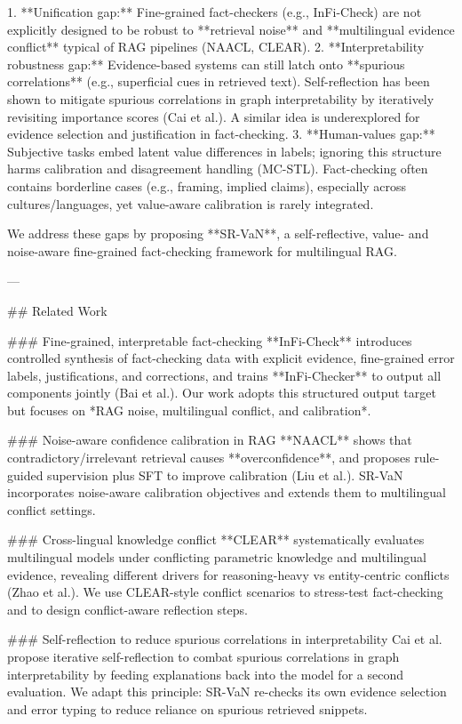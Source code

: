 1. **Unification gap:** Fine-grained fact-checkers (e.g., InFi-Check) are not explicitly designed to be robust to **retrieval noise** and **multilingual evidence conflict** typical of RAG pipelines (NAACL, CLEAR).  
2. **Interpretability robustness gap:** Evidence-based systems can still latch onto **spurious correlations** (e.g., superficial cues in retrieved text). Self-reflection has been shown to mitigate spurious correlations in graph interpretability by iteratively revisiting importance scores (Cai et al.). A similar idea is underexplored for evidence selection and justification in fact-checking.  
3. **Human-values gap:** Subjective tasks embed latent value differences in labels; ignoring this structure harms calibration and disagreement handling (MC-STL). Fact-checking often contains borderline cases (e.g., framing, implied claims), especially across cultures/languages, yet value-aware calibration is rarely integrated.

We address these gaps by proposing **SR-VaN**, a self-reflective, value- and noise-aware fine-grained fact-checking framework for multilingual RAG.

---

## Related Work  

### Fine-grained, interpretable fact-checking  
**InFi-Check** introduces controlled synthesis of fact-checking data with explicit evidence, fine-grained error labels, justifications, and corrections, and trains **InFi-Checker** to output all components jointly (Bai et al.). Our work adopts this structured output target but focuses on *RAG noise, multilingual conflict, and calibration*.

### Noise-aware confidence calibration in RAG  
**NAACL** shows that contradictory/irrelevant retrieval causes **overconfidence**, and proposes rule-guided supervision plus SFT to improve calibration (Liu et al.). SR-VaN incorporates noise-aware calibration objectives and extends them to multilingual conflict settings.

### Cross-lingual knowledge conflict  
**CLEAR** systematically evaluates multilingual models under conflicting parametric knowledge and multilingual evidence, revealing different drivers for reasoning-heavy vs entity-centric conflicts (Zhao et al.). We use CLEAR-style conflict scenarios to stress-test fact-checking and to design conflict-aware reflection steps.

### Self-reflection to reduce spurious correlations in interpretability  
Cai et al. propose iterative self-reflection to combat spurious correlations in graph interpretability by feeding explanations back into the model for a second evaluation. We adapt this principle: SR-VaN re-checks its own evidence selection and error typing to reduce reliance on spurious retrieved snippets.

